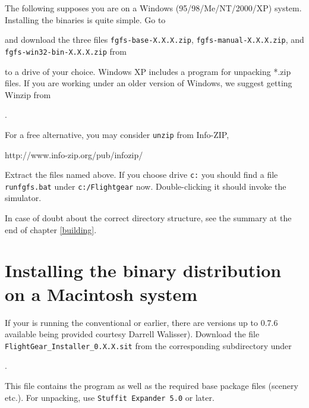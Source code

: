 The following supposes you are on a Windows (95/98/Me/NT/2000/XP)  system.
Installing the binaries is quite simple. Go to
 \medskip

  \medskip

 \noindent
and download the three files \texttt{fgfs-base-X.X.X.zip}, \texttt{fgfs-manual-X.X.X.zip}, and \texttt{fgfs-win32-bin-X.X.X.zip} from
 \medskip

\medskip

 \noindent
to a drive of your choice. Windows XP includes a program for unpacking *.zip files. If you are working under an older version of Windows, we suggest getting Winzip from
\medskip

.
\medskip

\noindent
For a free alternative, you may consider \texttt{unzip} from Info-ZIP,
\medskip

http://www.info-zip.org/pub/infozip/
\medskip

 \noindent
Extract the files named above. If you choose drive \texttt{c:} you should find a file
\texttt{runfgfs.bat} under \texttt{c:/Flightgear} now. Double-clicking it should invoke
the simulator.

In case of doubt about the correct directory structure, see the summary at the
end of chapter \ref{building}.

\section{Installing the binary distribution on a Macintosh system}

If your  is running the conventional  or earlier, there are versions up to \FlightGear{} 0.7.6 available being provided courtesy Darrell
Walisser). Download the file \verb/FlightGear_Installer_0.X.X.sit/ from the corresponding subdirectory under
 \medskip

.
 \medskip

 \noindent
This file contains the program as well as the required base package files (scenery etc.).
For unpacking, use \texttt{Stuffit Expander 5.0} or later.

